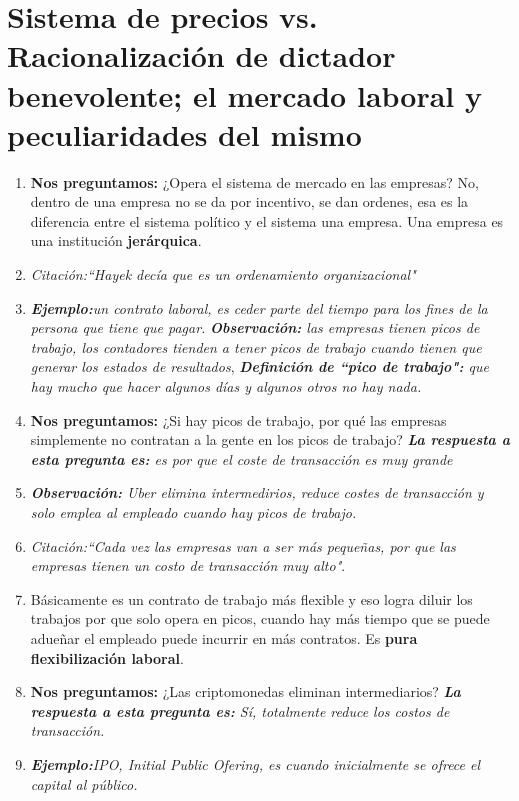 \section{Sistema de precios vs. Racionalización de dictador benevolente; el mercado laboral y peculiaridades del mismo}
\begin{enumerate}
    \item \textbf{Nos preguntamos:} ¿Opera el sistema de mercado en las empresas? No, dentro de una empresa no se da por incentivo, se dan ordenes, esa es la diferencia entre el sistema político y el sistema una empresa. Una empresa es una institución \textbf{jerárquica}.
    \item \emph{Citación:``Hayek decía que es un ordenamiento organizacional"}
    \item \emph{\textbf{Ejemplo:}un contrato laboral, es ceder parte del tiempo para los fines de la persona que tiene que pagar.} \emph{\textbf{Observación: }las empresas tienen picos de trabajo, los contadores tienden a tener picos de trabajo cuando tienen que generar los estados de resultados}, \emph{\textbf{Definición de ``pico de trabajo":} que hay mucho que hacer algunos días y algunos otros no hay nada.} 
    \item \textbf{Nos preguntamos:} ¿Si hay picos de trabajo, por qué las empresas simplemente no contratan a la gente en los picos de trabajo? \emph{\textbf{La respuesta a esta pregunta es: } es por que el coste de transacción es muy grande}
    \item \emph{\textbf{Observación: }Uber elimina intermedirios, reduce costes de transacción y solo emplea al empleado cuando hay picos de trabajo.}
    \item \emph{Citación:``Cada vez las empresas van a ser más pequeñas, por que las empresas tienen un costo de transacción muy alto"}.
    \item Básicamente es un contrato de trabajo más flexible y eso logra diluir los trabajos por que solo opera en picos, cuando hay más tiempo que se puede adueñar el empleado puede incurrir en más contratos. Es \textbf{pura flexibilización laboral}.
    \item \textbf{Nos preguntamos:} ¿Las criptomonedas eliminan intermediarios? \emph{\textbf{La respuesta a esta pregunta es: }Sí, totalmente reduce los costos de transacción.}
    \item \emph{\textbf{Ejemplo:}IPO, Initial Public Ofering, es cuando inicialmente se ofrece el capital al público.}
\end{enumerate}


